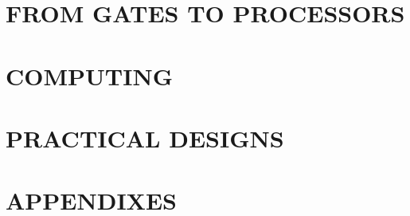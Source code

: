 \documentclass[11pt]{book}
\begin{document}
\part{FROM GATES TO PROCESSORS}





\part{COMPUTING}




\part{PRACTICAL DESIGNS}








%

\clearpage
{}
\part*{APPENDIXES}
\appendix










\clearpage

%
 


\clearpage
\printindex
\end{document}
